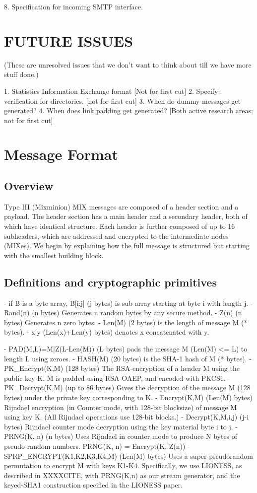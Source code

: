 8. Specification for incoming SMTP interface.


\section{FUTURE ISSUES}
(These are unresolved issues that we don't want to think about till we
have more stuff done.)

1. Statistics Information Exchange format
   [Not for first cut]
2. Specify: verification for directories.
	[not for first cut]
3. When do dummy messages get generated?
4. When does link padding get generated?
   [Both active research areas; not for first cut]

\section{Message Format}

\subsection{Overview}

Type III (Mixminion) MIX messages are composed of a header section and a
payload.  The header section has a main header and a
secondary header, both of which have identical structure.  Each
header is further composed of up to 16 subheaders, which are
addressed and encrypted to the intermediate nodes (MIXes).  We
begin by explaining how the full message is structured but starting
with the smallest building block.

\subsection{Definitions and cryptographic primitives}

- if B is a byte array, B[i:j] (j bytes) is sub array starting at 
  byte i with length j.
- Rand(n) (n bytes) Generates n random bytes by any secure method.
- Z(n) (n bytes) Generates n zero bytes.
- Len(M) (2 bytes) is the length of message M (* bytes).
- x|y (Len(x)+Len(y) bytes) denotes x concatenated with y.

- PAD(M,L)=M|Z(L-Len(M)) (L bytes) pads the message M (Len(M) <= L)
  to length L using zeroes.
- HASH(M) (20 bytes) is the SHA-1 hash of M (* bytes).
- PK_Encrypt(K,M) (128 bytes) The RSA-encryption of a header M 
  using the public key K.  M is padded using RSA-OAEP, and encoded
  with PKCS1.
- PK_Decrypt(K,M) (up to 86 bytes) Gives the decryption of the
  message M (128 bytes) under the private key corresponding to K.
- Encrypt(K,M) (Len(M) bytes) Rijndael encryption (in Counter mode,
  with 128-bit blocksize) of message M using key K.  (All Rijndael
  operations use 128-bit blocks.)
- Decrypt(K,M,i,j) (j-i bytes) Rijndael counter mode decryption 
  using the key material byte i to j.
- PRNG(K, n) (n bytes) Uses Rijndael in counter mode to produce N
  bytes of pseudo-random numbers.
  PRNG(K, n) = Encrypt(K, Z(n))
- SPRP_ENCRYPT(K1,K2,K3,K4,M) (Len(M) bytes) Uses a super-pseudorandom
  permutation to encrypt M with keys K1-K4.  Specifically, we use LIONESS,
  as described in XXXXCITE, with PRNG(K,n) as our stream generator,
  and the keyed-SHA1 construction specified in the LIONESS paper.

